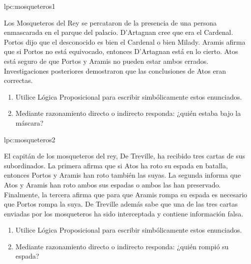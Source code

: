 %

\begin{defproblem}{lpc:mosqueteros1}%
 \begin{onlyproblem}%
Los Mosqueteros del Rey se percataron de la presencia de una persona enmascarada en el parque del palacio. 
D'Artagnan cree que era el Cardenal. 
Portos dijo que el desconocido es bien el Cardenal o bien Milady. 
Aramis afirma que si Portos no está equivocado, entonces D'Artagnan está en lo cierto. 
Atos está seguro de que Portos y Aramis no pueden estar ambos errados. 
Investigaciones posteriores demostraron que las conclusiones de Atos eran correctas. 
\begin{enumerate}
	\item Utilice Lógica Proposicional para escribir simbólicamente estos enunciados.
	\item Mediante razonamiento directo o indirecto responda: ¿quién estaba bajo la máscara?
\end{enumerate}
 \end{onlyproblem}%
 \begin{onlysolution}%
 
 \end{onlysolution}%
\end{defproblem}

\begin{defproblem}{lpc:mosqueteros2}%
 \begin{onlyproblem}%
 El capitán de los mosqueteros del rey, De Treville, ha recibido tres cartas de sus subordinados.
 La primera afirma que si Atos ha roto su espada en batalla, entonces Portos y Aramis han roto también las suyas.
 La segunda informa que Atos y Aramis han roto ambos sus espadas o ambos las han preservado.
 Finalmente, la tercera afirma que para que Aramis rompa su espada es necesario que Portos rompa la suya.
 De Treville además sabe que una de las tres cartas enviadas por los mosqueteros ha sido interceptada y contiene información falsa.
 \begin{enumerate}
 	\item Utilice Lógica Proposicional para escribir simbólicamente estos enunciados.%
 	\item Mediante razonamiento directo o indirecto responda: ¿quién rompió su espada?%
 \end{enumerate}
 \end{onlyproblem}%
 \begin{onlysolution}%

 \end{onlysolution}%
\end{defproblem}

